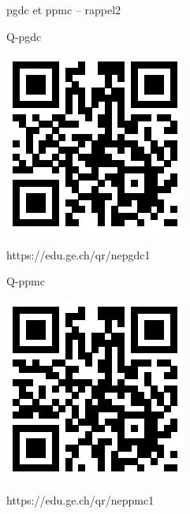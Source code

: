 \documentclass[a4paper,11pt]{report}
\begin{document}
	\begin{qmoodle}{pgdc et ppmc -- rappel}{2}{
	\begin{center}	
		Q-pgdc

\includegraphics[scale=1]{media/qr/nepgdc1}

\tiny{{https://edu.ge.ch/qr/nepgdc1}}

\end{center}
	\begin{center}	
		Q-ppmc

\includegraphics[scale=1]{media/qr/neppmc1}

\tiny{{https://edu.ge.ch/qr/neppmc1}}
\end{center}
}
\end{qmoodle}
\end{document}
